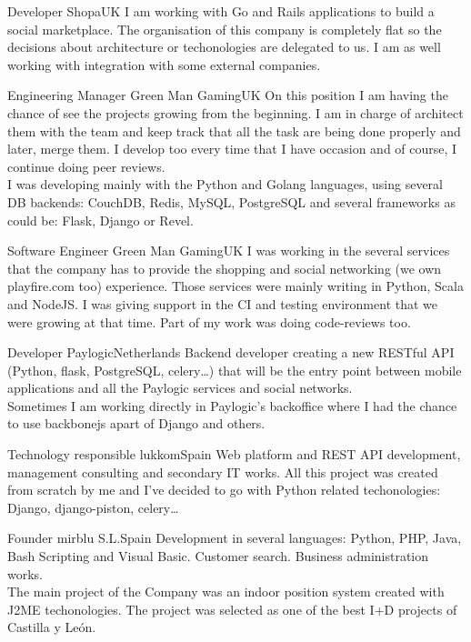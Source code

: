 \documentclass[11pt, a4paper, sans]{moderncv}
\begin{document}
\makecvtitle


%
%

{Developer}
{Shopa}{UK}{}
{I am working with Go and Rails applications to build a social marketplace. The
organisation of this company is completely flat so the decisions about
architecture or techonologies are delegated to us. I am as well working with
integration with some external companies.}

{Engineering Manager}
{Green Man Gaming}{UK}{}
{On this position I am having the chance of see the projects growing from the
beginning. I am in charge of architect them with the team and keep track that
all the task are being done properly and later, merge them. I develop too every
time that I have occasion and of course, I continue doing peer reviews.\\I was
developing mainly with the Python and Golang languages, using several DB
backends: CouchDB, Redis, MySQL, PostgreSQL and several frameworks as could be:
Flask, Django or Revel.}

{Software Engineer}
{Green Man Gaming}{UK}{}
{I was working in the several services that the company has to provide the
shopping and social networking (we own playfire.com too) experience. Those
services were mainly writing in Python, Scala and NodeJS. I was giving support
in the CI and testing environment that we were growing at that time. Part of my
work was doing code-reviews too.}

{Developer}
{Paylogic}{Netherlands}{}
{Backend developer creating a new RESTful API (Python, flask, PostgreSQL,
celery\ldots) that will be the entry point between mobile applications and all
the Paylogic services and social networks.\\Sometimes I am working directly in
Paylogic's backoffice where I had the chance to use backbonejs apart of Django
and others.}

{Technology responsible}
{lukkom}{Spain}{}
{Web platform and REST API development, management consulting and secondary IT
works. All this project was created from scratch by me and I've decided to go
with Python related techonologies: Django, django-piston, celery\ldots}

{Founder}
{mirblu S.L.}{Spain}{}
{Development in several languages: Python, PHP, Java, Bash Scripting and Visual
Basic. Customer search. Business administration works.\\The main project of the
Company was an indoor position system created with J2ME techonologies. The
project was selected as one of the best I+D projects of Castilla y León.}
\end{document}
